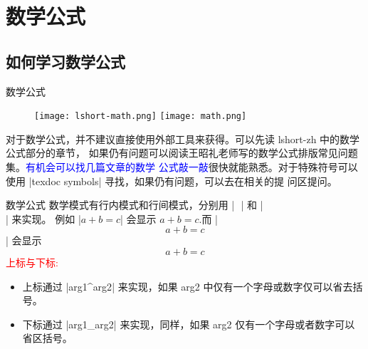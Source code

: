 \section{数学公式}
\subsection{如何学习数学公式}

\begin{frame}[fragile]{数学公式}
	\begin{figure}
		\centering
		\texttt{[image: lshort-math.png]}		
		\hspace{1cm}
		\texttt{[image: math.png]}	
	\end{figure}
\phantom{幻影}对于数学公式，并不建议直接使用外部工具来获得。可以先读 lshort-zh 中的数学公式部分的章节，
	如果仍有问题可以阅读王昭礼老师写的数学公式排版常见问题集。\textcolor{blue}{有机会可以找几篇文章的数学
	公式敲一敲}很快就能熟悉。对于特殊符号可以使用 |texdoc symbols| 寻找，如果仍有问题，可以去在相关的提
	问区提问。
\end{frame}

\begin{frame}[fragile]{数学公式}
	数学模式有行内模式和行间模式，分别用 | $ $ | 和 | \[ \] | 来实现。
	例如 |$ a+b = c $| 会显示  $a+b = c$.而 |\[ a+b = c\]|  会显示 
	\[a+b = c\]
	\textcolor{red}{上标与下标:}
	\begin{itemize}
		\item 上标通过 |arg1^{arg2}| 来实现，如果 arg2 中仅有一个字母或数字仅可以省去括号。
		\item 下标通过 |arg1_{arg2}| 来实现，同样，如果 arg2 仅有一个字母或者数字可以省区括号。
	\end{itemize}
\end{frame}


